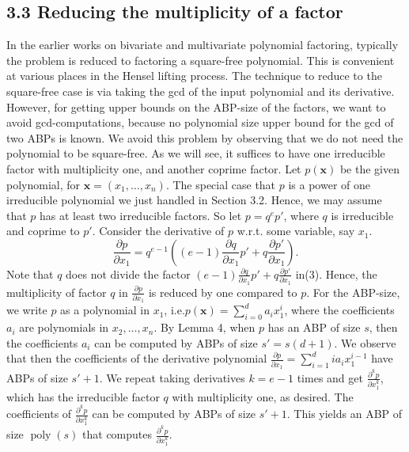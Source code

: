 \subsection*{3.3 Reducing the multiplicity of a factor}
In the earlier works on bivariate and multivariate polynomial factoring, typically the problem is reduced to factoring a square-free polynomial. This is convenient at various places in the Hensel lifting process. The technique to reduce to the square-free case is via taking the gcd of the input polynomial and its derivative. However, for getting upper bounds on the ABP-size of the factors, we want to avoid gcd-computations, because no polynomial size upper bound for the gcd of two ABPs is known.
We avoid this problem by observing that we do not need the polynomial to be square-free. As we will see, it suffices to have one irreducible factor with multiplicity one, and another coprime factor.
Let $p(\mathbf x)$ be the given polynomial, for $\mathbf x=(x_1,\ldots,x_n)$. The special case that $p$ is a power of one irreducible polynomial we just handled in Section 3.2. Hence, we may assume that $p$ has at least two irreducible factors. So let $p=q^ep'$, where $q$ is irreducible and coprime to $p'$.
Consider the derivative of $p$ w.r.t. some variable, say $x_1$.
\begin{equation}\frac{\partial p}{\partial x_1}=q^{e-1}\left((e-1)\frac{\partial q}{\partial x_1}p'+q\frac{\partial p'}{\partial x_1}\right).\tag{3}\end{equation}
Note that $q$ does not divide the factor $(e-1)\frac{\partial q}{\partial x_1}p'+q\frac{\partial p'}{\partial x_1}$ in(3). Hence, the multiplicity of factor $q$ in $\frac{\partial p}{\partial x_1}$ is reduced by one compared to $p$.
For the ABP-size, we write $p$ as a polynomial in $x_1$, i.e.$p(\mathbf x)=\sum_{i=0}^da_ix_1^i$, where the coefficients $a_i$ are polynomials in $x_2,\ldots,x_n$. By Lemma 4, when $p$ has an ABP of size $s$, then the coefficients $a_i$ can be computed by ABPs of size $s'=s(d+1)$. We observe that then the coefficients of the derivative polynomial $\frac{\partial p}{\partial x_1}=\sum_{i=1}^d ia_ix_1^{i-1}$ have ABPs of size $s'+1$.
We repeat taking derivatives $k=e-1$ times and get $\frac{\partial^kp}{\partial x_1^k}$, which has the irreducible factor $q$ with multiplicity one, as desired.
The coefficients of $\frac{\partial^kp}{\partial x_1^k}$ can be computed by ABPs of size $s'+1$. This yields an ABP of size $\operatorname{poly}(s)$ that computes $\frac{\partial^kp}{\partial x_1^k}$.
